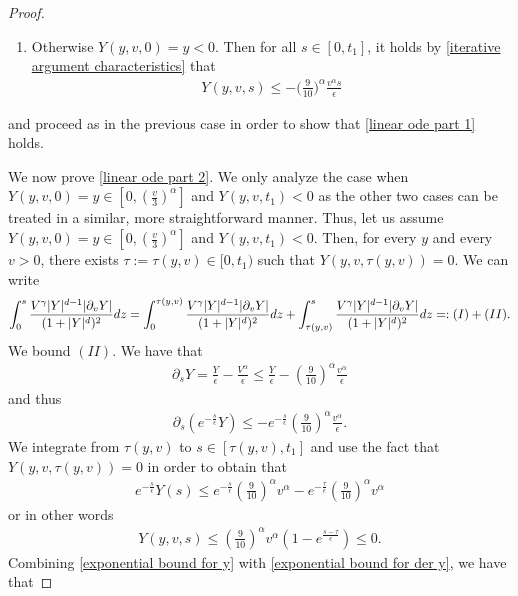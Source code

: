 \documentclass[10pt,a4paper]{amsart}
\newcommand{\der}{\textup{d}}
\begin{document}
\begin{proof}
\begin{enumerate}\item[iii)]Otherwise $Y(y,v,0)=y<0$. Then for all $s\in[0,t_{1}]$, it holds by  \eqref{iterative argument characteristics} that
  \begin{align*}
Y(y,v,s)\leq -\Big(\frac{9}{10}\Big)^{\alpha}\frac{v^{\alpha}s}{\epsilon}
  \end{align*}\end{enumerate}and proceed as in the previous case in order to show that \eqref{linear ode part 1} holds.


We now prove \eqref{linear ode part 2}. We only analyze the case when $Y(y,v,0)=y\in[0,(\frac{v}{3})^{\alpha}]$ and $Y(y,v,t_{1})<0$ as the other two cases can be treated in a similar, more straightforward manner.
Thus, let us assume $Y(y,v,0)=y\in[0,(\frac{v}{3})^{\alpha}]$ and $Y(y,v,t_{1})<0$. Then, for every $y$ and every $v>0$, there exists $\tau:=\tau(y,v)\in[0,t_{1})$ such that $Y(y,v,\tau(y,v))=0$. We can write 
\begin{align*}
     \int_{0}^{s}\frac{V^{\gamma}|Y|^{d-1}|\partial_{v}Y|}{(1+|Y|^{d})^{2}}\der z = \int_{0}^{\tau(y,v)}\frac{V^{\gamma}|Y|^{d-1}|\partial_{v}Y|}{(1+|Y|^{d})^{2}}\der z + \int_{\tau(y,v)}^{s}\frac{V^{\gamma}|Y|^{d-1}|\partial_{v}Y|}{(1+|Y|^{d})^{2}}\der z =:(I)+(II).
\end{align*}
We bound $(II)$.
We have that
\begin{align*}
    \partial_{s}Y=\frac{Y}{\epsilon}-\frac{V^{\alpha}}{\epsilon}\leq \frac{Y}{\epsilon}-(\frac{9}{10})^{\alpha}\frac{ v^{\alpha}}{\epsilon}
\end{align*}
and thus
\begin{align*}
    \partial_{s}(e^{-\frac{s}{\epsilon}}Y)\leq -e^{-\frac{s}{\epsilon}}(\frac{9}{10})^{\alpha}\frac{v^{\alpha}}{\epsilon}.
\end{align*}
We integrate from $\tau(y,v)$ to $s\in[\tau(y,v),t_{1}]$ and use the fact that $Y(y,v,\tau(y,v))=0$ in order to obtain that
\begin{align*}
   e^{-\frac{s}{\epsilon}}Y(s)\leq e^{-\frac{s}{\epsilon}}(\frac{9}{10})^{\alpha}v^{\alpha}-e^{-\frac{\tau}{\epsilon}}(\frac{9}{10})^{\alpha}v^{\alpha}
\end{align*}
or in other words
\begin{align}\label{exponential bound for y}
    Y(y,v,s)\leq (\frac{9}{10})^{\alpha}v^{\alpha}(1-e^{\frac{s-\tau}{\epsilon}})\leq 0.
\end{align}
Combining \eqref{exponential bound for y} with \eqref{exponential bound for der y}, we have that

\end{proof}
\end{document}
